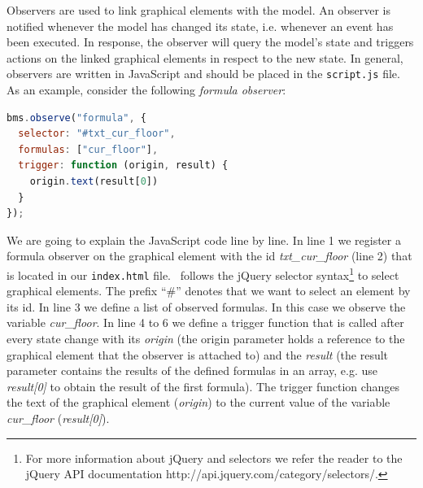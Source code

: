 Observers are used to link graphical elements with the model. 
An observer is notified whenever the model has changed its state, i.e. whenever an event has been executed. 
In response, the observer will query the model's state and triggers actions on the linked graphical elements in respect to the new state.
In general, observers are written in JavaScript and should be placed in the \texttt{script.js} file. 
As an example, consider the following \textit{formula observer}:

\begin{lstlisting}[language=JavaScript, caption={Formula Observer Displaying the Current Floor (JavaScript)}]
bms.observe("formula", {
  selector: "#txt_cur_floor",
  formulas: ["cur_floor"],
  trigger: function (origin, result) {
    origin.text(result[0])
  }
});
\end{lstlisting}


We are going to explain the JavaScript code line by line.
In line 1 we register a formula observer on the graphical element with the id \textit{txt\_cur\_floor} (line 2) that is located in our \texttt{index.html} file.
\bms~follows the jQuery selector syntax\footnote{For more information about jQuery and selectors we refer the reader to the jQuery
API documentation http://api.jquery.com/category/selectors/.} to select graphical elements.
The prefix ``\#'' denotes that we want to select an element by its id.
In line 3 we define a list of observed formulas.
In this case we observe the variable \textit{cur\_floor}.
In line 4 to 6 we define a trigger function that is called after every state change with its \textit{origin} (the origin parameter holds a reference to the graphical element that the observer is attached to) and the \textit{result} (the result parameter contains the results of the defined formulas in an array, e.g. use \textit{result[0]} to obtain the result of the first formula).
The trigger function changes the text of the graphical element (\textit{origin}) to the current value of the variable \textit{cur\_floor} (\textit{result[0]}).

